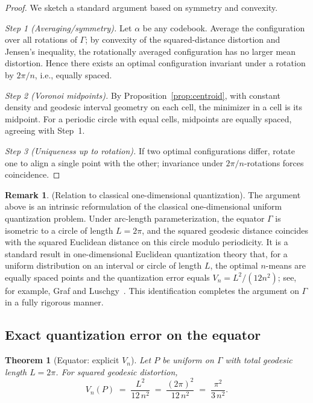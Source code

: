 \documentclass[12pt, reqno]{amsart}
\theoremstyle{plain}
\newtheorem{theorem1}[subsubsection]{Theorem}
\theoremstyle{definition}
\newtheorem{remark1}[subsubsection]{Remark}
\begin{document}
\begin{proof}
We sketch a standard argument based on symmetry and convexity.

\emph{Step 1 (Averaging/symmetry).} Let $\alpha$ be any codebook. Average the configuration over all rotations of $\Gamma$; by convexity of the squared-distance distortion and Jensen's inequality, the rotationally averaged configuration has no larger mean distortion. Hence there exists an optimal configuration invariant under a rotation by $2\pi/n$, i.e., equally spaced.

\emph{Step 2 (Voronoi midpoints).} By Proposition~\ref{prop:centroid}, with constant density and geodesic interval geometry on each cell, the minimizer in a cell is its midpoint. For a periodic circle with equal cells, midpoints are equally spaced, agreeing with Step~1.

\emph{Step 3 (Uniqueness up to rotation).} If two optimal configurations differ, rotate one to align a single point with the other; invariance under $2\pi/n$-rotations forces coincidence.
\end{proof}


\medskip
\begin{remark1} (Relation to classical one-dimensional quantization). 
The argument above is an intrinsic reformulation of the classical one-dimensional
uniform quantization problem. Under arc-length parameterization, the equator
$\Gamma$ is isometric to a circle of length $L = 2\pi$, and the squared geodesic
distance coincides with the squared Euclidean distance on this circle modulo
periodicity. It is a standard result in one-dimensional Euclidean quantization
theory that, for a uniform distribution on an interval or circle of length $L$,
the optimal $n$-means are equally spaced points and the quantization error equals
$V_n = L^2/(12n^2)$; see, for example, Graf and Luschgy~\cite{GrafLuschgy2000}.
This identification completes the argument on $\Gamma$ in a fully rigorous manner.
\end{remark1} 

\subsection{Exact quantization error on the equator}
\begin{theorem1}[Equator: explicit $V_n$]\label{thm:equator-Vn}
Let $P$ be uniform on $\Gamma$ with total geodesic length $L=2\pi$. For squared geodesic distortion,
\[
V_n(P)\;=\;\frac{L^2}{12\,n^2}\;=\;\frac{(2\pi)^2}{12\,n^2}\;=\;\frac{\pi^2}{3\,n^2}.
\]
\end{theorem1}
\end{document}
